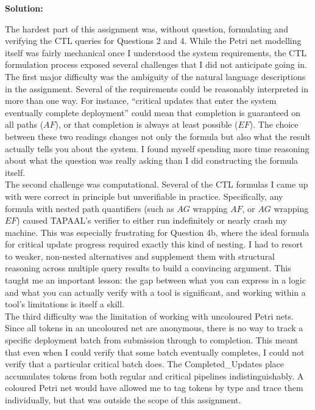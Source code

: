 \documentclass[10pt]{article}
\newcounter{question}
\newenvironment{solution}{
	\vspace{1em}\par\large\textbf{{Solution:}}\par\vspace{1em}
}{
	\vspace{1em}
}
\begin{document}
\begin{solution}
	The hardest part of this assignment was, without question, formulating and verifying the CTL queries for Questions 2 and 4. While the Petri net modelling itself was fairly mechanical once I understood the system requirements, the CTL formulation process exposed several challenges that I did not anticipate going in. \\

	The first major difficulty was the ambiguity of the natural language descriptions in the assignment. Several of the requirements could be reasonably interpreted in more than one way. For instance, ``critical updates that enter the system eventually complete deployment'' could mean that completion is guaranteed on all paths ($AF$), or that completion is always at least possible ($EF$). The choice between these two readings changes not only the formula but also what the result actually tells you about the system. I found myself spending more time reasoning about what the question was really asking than I did constructing the formula itself. \\

	The second challenge was computational. Several of the CTL formulas I came up with were correct in principle but unverifiable in practice. Specifically, any formula with nested path quantifiers (such as $AG$ wrapping $AF$, or $AG$ wrapping $EF$) caused TAPAAL's verifier to either run indefinitely or nearly crash my machine. This was especially frustrating for Question 4b, where the ideal formula for critical update progress required exactly this kind of nesting. I had to resort to weaker, non-nested alternatives and supplement them with structural reasoning across multiple query results to build a convincing argument. This taught me an important lesson: the gap between what you can express in a logic and what you can actually verify with a tool is significant, and working within a tool's limitations is itself a skill. \\

	The third difficulty was the limitation of working with uncoloured Petri nets. Since all tokens in an uncoloured net are anonymous, there is no way to track a specific deployment batch from submission through to completion. This meant that even when I could verify that some batch eventually completes, I could not verify that a particular critical batch does. The Completed\_Updates place accumulates tokens from both regular and critical pipelines indistinguishably. A coloured Petri net would have allowed me to tag tokens by type and trace them individually, but that was outside the scope of this assignment. \\


\end{solution}
\end{document}
